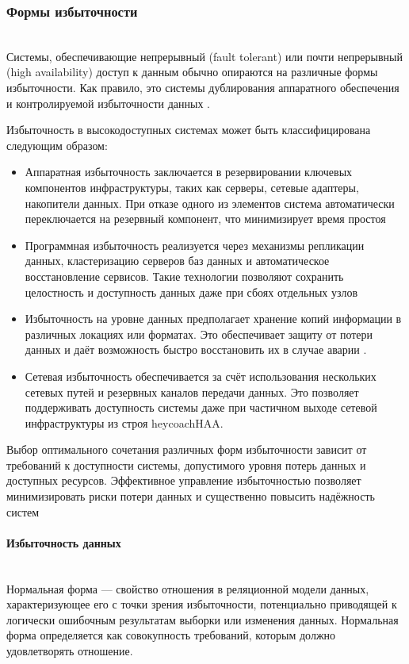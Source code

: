 \subsubsection{Формы избыточности} ~\\
Системы, обеспечивающие непрерывный (fault tolerant) или почти
непрерывный (high availability) доступ к данным обычно опираются на различные формы избыточности.
Как правило, это системы дублирования аппаратного обеспечения и контролируемой
избыточности данных \autocite{Baron}.

Избыточность в высокодоступных системах может быть классифицирована следующим образом:

\begin{itemize}
    \item Аппаратная избыточность заключается в резервировании ключевых компонентов инфраструктуры, таких как серверы, сетевые адаптеры, накопители данных. При отказе одного из элементов система автоматически переключается на резервный компонент, что минимизирует время простоя \autocites{RajeshKumar}{heycoachHAA}
    \item Программная избыточность реализуется через механизмы репликации данных, кластеризацию серверов баз данных и автоматическое восстановление сервисов. Такие технологии позволяют сохранить целостность и доступность данных даже при сбоях отдельных узлов \autocite{OszuValduriez}
    \item Избыточность на уровне данных предполагает хранение копий информации в различных локациях или форматах. Это обеспечивает защиту от потери данных и даёт возможность быстро восстановить их в случае аварии \autocite{Kleppmann}.
    \item Сетевая избыточность обеспечивается за счёт использования нескольких сетевых путей и резервных каналов передачи данных. Это позволяет поддерживать доступность системы даже при частичном выходе сетевой инфраструктуры из строя \autocite{RajeshKumar}{heycoachHAA}.
\end{itemize}
Выбор оптимального сочетания различных форм избыточности зависит от требований к доступности системы, допустимого уровня потерь данных и доступных ресурсов. Эффективное управление избыточностью позволяет минимизировать риски потери данных и существенно повысить надёжность систем \autocite{OszuValduriez}

\paragraph{Избыточность данных} ~\\
Нормальная форма — свойство отношения в реляционной модели данных, характеризующее его с точки зрения избыточности, потенциально приводящей к логически ошибочным результатам выборки или изменения данных. Нормальная форма определяется как совокупность требований, которым должно удовлетворять отношение.


